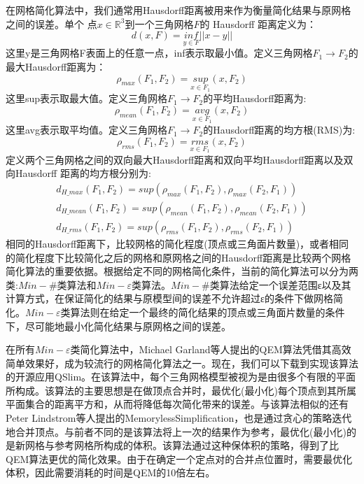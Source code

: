 在网格简化算法中，我们通常用Hausdorff距离\cite{hausdorff-dis}被用来作为衡量简化结果与原网格之间的误差。单个
点$x\in\mathbb{R}^3$到一个三角网格$F$的 Hausdorff 距离定义为：
\begin{equation}
  d(x, F) = \underset{y\in F}{inf}||x-y||
  \label{eq:v2f-haus}
\end{equation}
这里y是三角网格F表面上的任意一点，inf表示取最小值。定义三角网格$F_1 \to F_2$的最大Hausdorff距离为：
\begin{equation}
  \rho_{max}(F_1,F_2)=\underset{x\in F_1}{sup}(x,F_2)
  \label{eq:f2f-max-haus}
\end{equation}
这里sup表示取最大值。定义三角网格$F_1 \to F_2$的平均Hausdorff距离为:
\begin{equation}
  \rho_{mean}(F_1,F_2)=\underset{x\in F_1}{avg}(x,F_2)
  \label{eq:f2f-mean-haus}
\end{equation}
这里avg表示取平均值。定义三角网格$F_1 \to F_2$的Hausdorff距离的均方根(RMS)为:
\begin{equation}
  \rho_{rms}(F_1,F_2)=\underset{x\in F_1}{rms}(x,F_2)
  \label{eq:f2f-rms-haus}
\end{equation}
定义两个三角网格之间的双向最大Hausdorff距离和双向平均Hausdorff距离以及双向Hausdorff 距离的均方根分别为:
\begin{equation}
  \begin{array}{l}
    d_{H\_max}(F_1,F_2)=sup(\rho_{max}(F_1,F_2), \rho_{max}(F_2,F_1))\\
    d_{H\_mean}(F_1,F_2)=sup(\rho_{mean}(F_1,F_2), \rho_{mean}(F_2,F_1))\\
    d_{H\_rms}(F_1,F_2)=sup(\rho_{rms}(F_1,F_2), \rho_{rms}(F_2,F_1))
  \end{array}
  \label{eq:ff-haus}
\end{equation}
相同的Hausdorff距离下，比较网格的简化程度(顶点或三角面片数量)，或者相同的简化程度下比较简化之后的网格和原网格之间的Hausdorff距离是比较两个网格简化算法的重要依据。根据给定不同的网格简化条件，当前的简化算法可以分为两类:$Min−\#$类算法和$Min−\varepsilon$类算法\cite{simp-envlop}。$Min−\#$类算法给定一个误差范围ε以及其计算方式，在保证简化的结果与原模型间的误差不允许超过ε的条件下做网格简化。$Min−\varepsilon$类算法则在给定一个最终的简化结果的顶点或三角面片数量的条件下，尽可能地最小化简化结果与原网格之间的误差。\par
在所有$Min−\varepsilon$类简化算法中，Michael Garland等人提出的QEM算法\cite{qem1}凭借其高效简单效果好，成为较流行的网格简化算法之一。现在，我们可以下载到实现该算法的开源应用QSlim。在该算法中，每个三角网格模型被视为是由很多个有限的平面所构成。该算法的主要思想是在做顶点合并时，最优化(最小化)每个顶点到其所属平面集合的距离平方和，从而将降低每次简化带来的误差。与该算法相似的还有Peter Lindstrom等人提出的MemorylessSimplification，也是通过贪心的策略迭代地合并顶点。与前者不同的是该算法将上一次的结果作为参考，最优化(最小化)的是新网格与参考网格所构成的体积。该算法通过这种保体积的策略，得到了比QEM算法更优的简化效果。由于在确定一个定点对的合并点位置时，需要最优化体积，因此需要消耗的时间是QEM的10倍左右。\par
